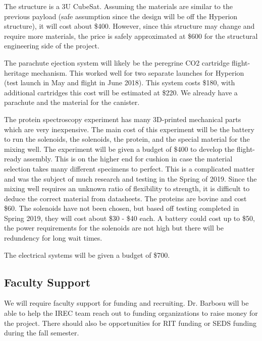 \documentclass[conference]{IEEEtran} %
\begin{document}
The structure is a 3U CubeSat. Assuming the materials are similar to the previous payload (safe assumption since the design will be off the Hyperion structure), it will cost about \$400. 
However, since this structure may change and require more materials, the price is safely approximated at \$600 for the structural engineering side of the project. 

The parachute ejection system will likely be the peregrine CO2 cartridge flight-heritage mechanism. This worked well for two separate launches for Hyperion (test launch in May and flight in June 2018). 
This system costs \$180, with additional cartridges this cost will be estimated at \$220. We already have a parachute and the material for the canister. 

The protein spectroscopy experiment has many 3D-printed mechanical parts which are very inexpensive. The main cost of this experiment will be the battery to run the solenoids, the solenoids, 
the protein, and the special material for the mixing well. The experiment will be given a budget of \$400 to develop the flight-ready assembly. This is on the higher end for cushion in case 
the material selection takes many different specimens to perfect. This is a complicated matter and was the subject of much research and testing in the Spring of 2019. Since the mixing well 
requires an unknown ratio of flexibility to strength, it is difficult to deduce the correct material from datasheets. The proteins are bovine and cost \$60. The solenoids have not been 
chosen, but based off testing completed in Spring 2019, they will cost about \$30 - \$40 each. A battery could cost up to \$50, the power requirements for the solenoids are not high but there 
will be redundency for long wait times. 

The electrical systems will be given a budget of \$700. 

\subsection{Faculty Support}
We will require faculty support for funding and recruiting. Dr. Barbosu will be able to help the IREC team reach out to funding organizations to raise money for the project. There should also be 
opportunities for RIT funding or SEDS funding during the fall semester. 
\end{document}
